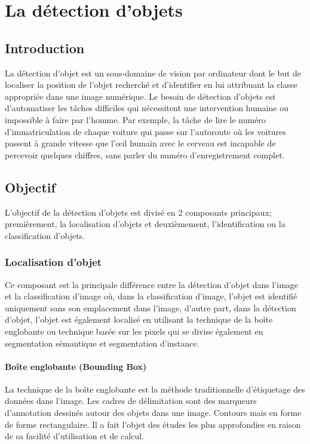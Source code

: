  \chapter{La détection d'objets}
\minitoc
\newpage
\pagestyle{fancy}
\fancyhead[L]{\chaptername \ \thechapter}
\renewcommand{\headrulewidth}{1pt}
\fancyfoot[C]{\thepage}

\section{Introduction} 
La détection d'objet est un sous-domaine de vision par ordinateur dont le but de localiser la position de l'objet recherché et d'identifier en lui attribuant la classe appropriée dans une image numérique. Le besoin de détection d'objets est d'automatiser les tâches difficiles qui nécessitent une intervention humaine ou impossible à faire par l'homme. Par exemple, la tâche de lire le numéro d'immatriculation
de chaque voiture qui passe sur l'autoroute où les voitures passent à grande vitesse que l'œil humain avec le cerveau est incapable de percevoir quelques chiffres, sans parler du numéro d'enregistrement complet.
\section{Objectif}
L'objectif de la détection d'objets est divisé en 2 composants principaux; premièrement, la localisation d'objets et deuxièmement, l'identification ou la classification d'objets.
\subsection{Localisation d'objet}
Ce composant est la principale différence entre la détection d'objet dans l'image et la classification d'image où, dans la classification d'image, l'objet est identifié uniquement sans son emplacement dans l'image, d'autre part, dans la détection d'objet, l'objet est également localisé en utilisant la technique de la boîte englobante ou technique basée sur les pixels qui se divise également en segmentation sémantique et segmentation d'instance.
\subsubsection{Boîte englobante (Bounding Box)}
La technique de la boîte englobante est la méthode traditionnelle d'étiquetage des données dans l'image. Les cadres de délimitation sont des marqueurs d'annotation dessinés autour des objets dans une image. Contours mais en forme de forme rectangulaire. Il a fait l'objet des études les plus approfondies en raison de sa facilité d'utilisation et de calcul.

